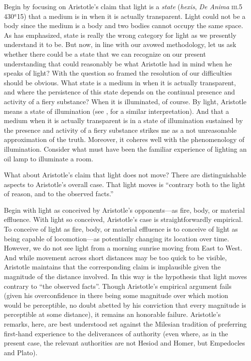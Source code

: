 Begin by focusing on Aristotle's claim that light is a \emph{state} (\emph{hexis}, \emph{De Anima} \textsc{iii}.5 430\( ^{a} \)15) that a medium is in when it is actually transparent. Light could not be a body since the medium is a body and two bodies cannot occupy the same space. As \citet{Burnyeat:1995fk} has emphasized, state is really the wrong category for light as we presently understand it to be. But now, in line with our avowed methodology, let us ask whether there could be a state that we can recognize on our present understanding that could reasonably be what Aristotle had in mind when he speaks of light? With the question so framed the resolution of our difficulties should be obvious. What state is a medium in when it is actually transparent, and where the persistence of this state depends on the continual presence and activity of a fiery substance? When it is illuminated, of course. By light, Aristotle means a state of illumination (see \citealt[122]{Thorp:1982fk}, for a similar interpretation). And that a medium when it is actually transparent is in a state of illumination sustained by the presence and activity of a fiery substance strikes me as a not unreasonable approximation of the truth. Moreover, it coheres well with the phenomenology of illumination. Consider what must have been the familiar experience of lighting an oil lamp to illuminate a room.

What about Aristotle's claim that light does not move? There are distinguishable aspects to Aristotle's overall case. That light moves is ``contrary both to the light of reason, and to the observed facts.''

Begin with light as conceived by Aristotle's opponents---as fire, body, or material effluence. With light so conceived, Aristotle's case is straightforwardly empirical. To conceive of light as fire, body, or material effluence is to conceive of light as being capable of locomotion---as potentially changing its location over time. However, we do not see light from a morning sunrise moving from East to West. And while movement across short distances may be too quick to be visible, Aristotle maintains that the corresponding claim is implausible given the magnitude of the distance involved. In this way is the hypothesis that light moves contrary to ``the observed facts''. Though Aristotle's empirical argument fails (given his overconfidence in there being some magnitude over which motion would be perceptible, no doubt abetted by his conviction that every magnitude is perceptible at some distance), it remains an honorable failure. Aristotle's remarks, here, are best understood set against the Milesian tradition of preferring first-hand experience to the deliverances of authority (even where, as in the present case, the relevant authorities are not Hesiod and Homer, but Empedocles and Plato).

